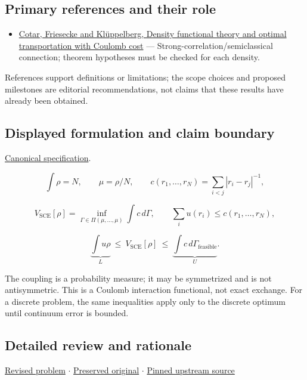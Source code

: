 \documentclass[
  11pt,
]{article}
\providecommand{\tightlist}{%
  \setlength{\itemsep}{0pt}\setlength{\parskip}{0pt}}
\begin{document}
\subsection{Primary references and their role}

\begin{itemize}
\tightlist
\item
  \href{https://arxiv.org/abs/1104.0603}{Cotar, Friesecke and
  Klüppelberg, Density functional theory and optimal transportation with
  Coulomb cost} --- Strong-correlation/semiclassical connection; theorem
  hypotheses must be checked for each density.
\end{itemize}

References support definitions or limitations; the scope choices and
proposed milestones are editorial recommendations, not claims that these
results have already been obtained.

\subsection{Displayed formulation and claim boundary}

\href{https://github.com/rick-stevens-ai/Pure-Thought/blob/main/PRDs/18-Optimal-Transport-Chemistry.md}{Canonical
specification}.

\[\int\rho=N,\qquad \mu=\rho/N,\qquad
c(r_1,\ldots,r_N)=\sum_{i<j}|r_i-r_j|^{-1},\]

\[V_{\mathrm{SCE}}[\rho]=\inf_{\Gamma\in\Pi(\mu,\ldots,\mu)}\int c\,d\Gamma,
\qquad \sum_i u(r_i)\le c(r_1,\ldots,r_N),\]

\[\underbrace{\int u\rho}_{L}\ \le\ V_{\mathrm{SCE}}[\rho]\ \le\
\underbrace{\int c\,d\Gamma_{\mathrm{feasible}}}_{U}.\]

The coupling is a probability measure; it may be symmetrized and is not
antisymmetric. This is a Coulomb interaction functional, not exact
exchange. For a discrete problem, the same inequalities apply only to
the discrete optimum until continuum error is bounded.

\subsection{Detailed review and rationale}

\href{https://github.com/rick-stevens-ai/Pure-Thought/blob/main/PRDs/18-Optimal-Transport-Chemistry.md}{Revised
problem} \ensuremath{\cdot}
\href{https://github.com/rick-stevens-ai/Pure-Thought/blob/main/archive/original-PRDs/18-Optimal-Transport-Chemistry.md}{Preserved
original} \ensuremath{\cdot}
\href{https://github.com/rick-stevens-ai/Pure-Thought/blob/f854d4e12b55c1f5b5c2a964b75f2d23496d981e/PRDs/18-Optimal-Transport-Chemistry.md}{Pinned
upstream source}
\end{document}
